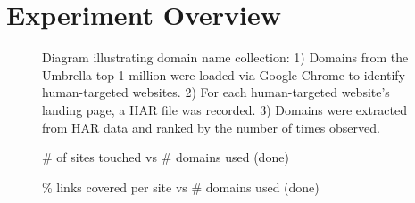 \section{Experiment Overview} \label{oversky}

\begin{figure}
    \caption{Diagram illustrating domain name collection: 1) Domains from the Umbrella top 1-million were loaded via Google Chrome to identify human-targeted websites. 2) For each human-targeted website's landing page, a HAR file was recorded. 3) Domains were extracted from HAR data and ranked by the number of times observed.}
\end{figure}

\begin{figure}
    \caption{\# of sites touched vs \# domains used (done)}
\end{figure}

\begin{figure}
    \caption{\% links covered per site vs \# domains used (done)}
\end{figure}



